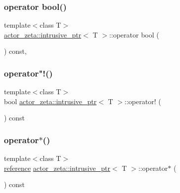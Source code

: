 \mbox{\label{classactor__zeta_1_1intrusive__ptr_a8d604f6ab26b980e438b8c3366efc503}} 
\subsubsection{\texorpdfstring{operator bool()}{operator bool()}}
{\footnotesize\ttfamily template$<$class T$>$ \\
\hyperlink{classactor__zeta_1_1intrusive__ptr}{actor\+\_\+zeta\+::intrusive\+\_\+ptr}$<$ T $>$\+::operator bool (\begin{DoxyParamCaption}{ }\end{DoxyParamCaption}) const\hspace{0.3cm}{\ttfamily [inline]}, {\ttfamily [explicit]}}

\mbox{\label{classactor__zeta_1_1intrusive__ptr_aa7082a7008b76847b64dbdf7be176cd9}} 
\subsubsection{\texorpdfstring{operator"!()}{operator!()}}
{\footnotesize\ttfamily template$<$class T$>$ \\
bool \hyperlink{classactor__zeta_1_1intrusive__ptr}{actor\+\_\+zeta\+::intrusive\+\_\+ptr}$<$ T $>$\+::operator! (\begin{DoxyParamCaption}{ }\end{DoxyParamCaption}) const\hspace{0.3cm}{\ttfamily [inline]}}

\mbox{\label{classactor__zeta_1_1intrusive__ptr_a737d190410f26fb31e9a52c508a01711}} 
\subsubsection{\texorpdfstring{operator$\ast$()}{operator*()}}
{\footnotesize\ttfamily template$<$class T$>$ \\
\hyperlink{classactor__zeta_1_1intrusive__ptr_a016742eccc554bd6f7af0db0cf584abb}{reference} \hyperlink{classactor__zeta_1_1intrusive__ptr}{actor\+\_\+zeta\+::intrusive\+\_\+ptr}$<$ T $>$\+::operator$\ast$ (\begin{DoxyParamCaption}{ }\end{DoxyParamCaption}) const\hspace{0.3cm}{\ttfamily [inline]}}

